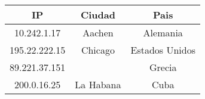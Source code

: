 \begin{tabular}{|c|c|c|}
	\hline
	IP & Ciudad & Pais \\
	\hline
	10.242.1.17 & Aachen & Alemania \\
	\hline
	195.22.222.15 & Chicago & Estados Unidos  \\
	\hline
	89.221.37.151 &  & Grecia \\
	\hline
	200.0.16.25 & La Habana & Cuba \\
	\hline
\end{tabular}
